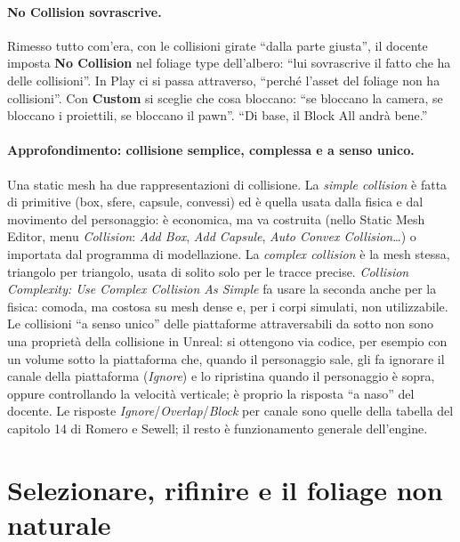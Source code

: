 \paragraph{No Collision sovrascrive.} Rimesso tutto com'era, con le collisioni girate ``dalla
parte giusta'', il docente imposta \textbf{No Collision} nel foliage type dell'albero: ``lui
sovrascrive il fatto che ha delle collisioni''. In Play ci si passa attraverso, ``perché l'asset
del foliage non ha collisioni''. Con \textbf{Custom} si sceglie che cosa bloccano: ``se bloccano
la camera, se bloccano i proiettili, se bloccano il pawn''. ``Di base, il Block All andrà
bene.''

\paragraph{Approfondimento: collisione semplice, complessa e a senso unico.} Una static mesh
ha due rappresentazioni di collisione. La \emph{simple collision} è fatta di primitive
(box, sfere, capsule, convessi) ed è quella usata dalla fisica e dal movimento del
personaggio: è economica, ma va costruita (nello Static Mesh Editor, menu
\emph{Collision}: \emph{Add Box}, \emph{Add Capsule}, \emph{Auto Convex Collision}\dots)
o importata dal programma di modellazione. La \emph{complex collision} è la mesh stessa,
triangolo per triangolo, usata di solito solo per le tracce precise. \emph{Collision
Complexity: Use Complex Collision As Simple} fa usare la seconda anche per la fisica: comoda,
ma costosa su mesh dense e, per i corpi simulati, non utilizzabile. Le collisioni ``a senso
unico'' delle piattaforme attraversabili da sotto non sono una proprietà della collisione
in Unreal: si ottengono via codice, per esempio con un volume sotto la piattaforma che, quando
il personaggio sale, gli fa ignorare il canale della piattaforma (\emph{Ignore}) e lo
ripristina quando il personaggio è sopra, oppure controllando la velocità verticale; è
proprio la risposta ``a naso'' del docente. Le risposte \emph{Ignore}/\emph{Overlap}/\emph{Block}
per canale sono quelle della tabella del capitolo 14 di Romero e Sewell; il resto è
funzionamento generale dell'engine.

\section{Selezionare, rifinire e il foliage non naturale}
\label{ue15:sec:selezione}

